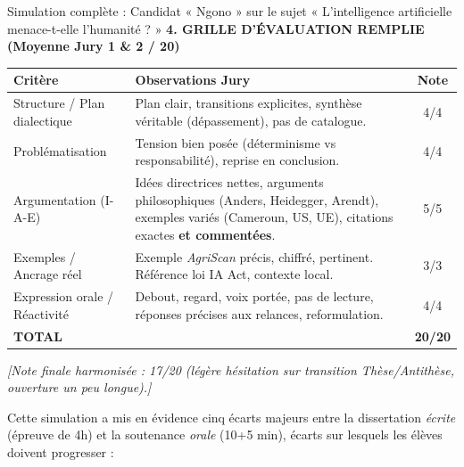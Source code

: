 \documentclass[11pt]{article}
\newcounter{popsec}
\newcounter{popsub}
\newcommand{\courssub}[1]{%
  \stepcounter{popsub}%
  \par\vspace{9pt}\noindent{\popxbold\fontsize{11.5}{13}\selectfont\color{popink}{\color{poporange}\thepopsec.\thepopsub}\hspace{6pt}#1}\par\nopagebreak\vspace{4pt}
}
\begin{document}
\begin{exoresolu}{Simulation complète : Candidat « Ngono » sur le sujet « L'intelligence artificielle menace-t-elle l'humanité ? »}
\textbf{4. GRILLE D'ÉVALUATION REMPLIE (Moyenne Jury 1 \& 2 / 20)}

\begin{center}
\begin{tabularx}{\linewidth}{|l|X|c|}
\hline
\textbf{Critère} & \textbf{Observations Jury} & \textbf{Note} \\
\hline
Structure / Plan dialectique & Plan clair, transitions explicites, synthèse véritable (dépassement), pas de catalogue. & 4/4 \\
\hline
Problématisation & Tension bien posée (déterminisme vs responsabilité), reprise en conclusion. & 4/4 \\
\hline
Argumentation (I-A-E) & Idées directrices nettes, arguments philosophiques (Anders, Heidegger, Arendt), exemples variés (Cameroun, US, UE), citations exactes \textbf{et commentées}. & 5/5 \\
\hline
Exemples / Ancrage réel & Exemple \emph{AgriScan} précis, chiffré, pertinent. Référence loi IA Act, contexte local. & 3/3 \\
\hline
Expression orale / Réactivité & Debout, regard, voix portée, pas de lecture, réponses précises aux relances, reformulation. & 4/4 \\
\hline
\textbf{TOTAL} & & \textbf{20/20} \\
\hline
\end{tabularx}
\end{center}

\textit{[Note finale harmonisée : 17/20 (légère hésitation sur transition Thèse/Antithèse, ouverture un peu longue).]}
\end{exoresolu}

\courssub{Bilan de l'activité}
Cette simulation a mis en évidence cinq écarts majeurs entre la dissertation \emph{écrite} (épreuve de 4h) et la soutenance \emph{orale} (10+5 min), écarts sur lesquels les élèves doivent progresser :
\end{document}

